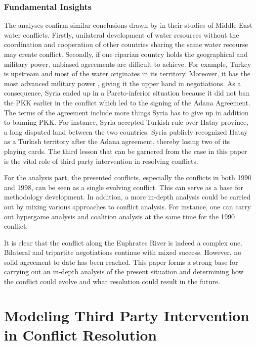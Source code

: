 \documentclass[letterpaper,12pt,titlepage,oneside,final]{book}
\begin{document}
\subsection{Fundamental Insights}
The analyses confirm similar conclusions drawn by \citet{priscoli2009managing} in their studies of Middle East water conflicts. Firstly, unilateral development of water resources without the coordination and cooperation of other countries sharing the same water recourse may create conflict. Secondly, if one riparian country holds the geographical and military power, unbiased agreements are difficult to achieve. For example, Turkey is upstream and most of the water originates in its territory. Moreover, it has the most advanced military power \citep{priscoli2009managing}, giving it the upper hand in negotiations. As a consequence, Syria ended up in a Pareto-inferior situation because it did not ban the PKK earlier in the conflict which led to the signing of the Adana Agreement. The terms of the agreement include more things Syria has to give up in addition to banning PKK. For instance, Syria accepted Turkish rule over Hatay province, a long disputed land between the two countries. Syria publicly recognized Hatay as a Turkish territory after the Adana agreement, thereby losing two of its playing cards. The third lesson that can be garnered from the case in this paper is the vital role of third party intervention in resolving conflicts.

For the analysis part, the presented conflicts, especially the conflicts in both 1990 and 1998, can be seen as a single evolving conflict. This can serve as a base for methodology development. In addition, a more in-depth analysis could be carried out by mixing various approaches to conflict analysis. For instance, one can carry out hypergame analysis and coalition analysis at the same time for the 1990 conflict.

It is clear that the conflict along the Euphrates River is indeed a complex one. Bilateral and tripartite negotiations continue with mixed success. However, no solid agreement to date has been reached. This paper forms a strong base for carrying out an in-depth analysis of the present situation and determining how the conflict could evolve and what resolution could result in the future. 



\chapter{Modeling Third Party Intervention in Conflict Resolution}
\end{document}
